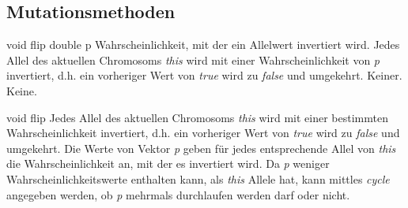 \documentclass{report}
\begin{document}
\newpage 
\subsection{Mutationsmethoden}


\setNormalInstance
\printMethodWithOneParam
{void}
{flip}
{double}
{p}
{Wahrscheinlichkeit, mit der ein Allelwert invertiert 
                        wird.}
{Jedes Allel des aktuellen Chromosoms {\em this} wird mit einer Wahrscheinlichkeit
    von {\em p} invertiert, d.h. ein vorheriger Wert von {\em true} wird zu {\em false}
    und umgekehrt.}
{Keiner.}
{Keine.}

\vspace{4ex}

\setNormalInstance
\setCorrectWidthThree{8pt}

\printMethodWithParamsSaved
{void}
{}
{flip}
{Jedes Allel des aktuellen Chromosoms {\em this} wird mit einer bestimmten
    Wahrscheinlichkeit invertiert, d.h. ein vorheriger Wert von {\em true} wird 
    zu {\em false} und umgekehrt. Die Werte von Vektor {\em p} geben f\"ur jedes
    entsprechende Allel von {\em this} die Wahrscheinlichkeit an, mit der es 
    invertiert wird. Da {\em p} weniger Wahrscheinlichkeitswerte enthalten kann,
    als {\em this} Allele hat, kann mittles {\em cycle} angegeben werden, ob 
    {\em p} mehrmals durchlaufen werden darf oder nicht.}
{}
\setCorrectWidthThree{4pt}
\end{document}
